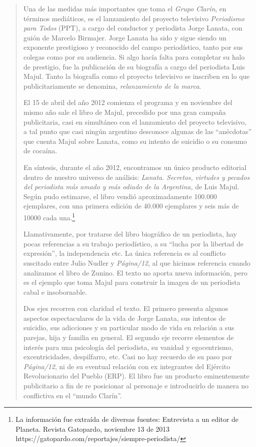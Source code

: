 \begin{quote}
Una de las medidas más importantes que toma el \emph{Grupo Clarín}, en términos mediáticos, es el lanzamiento del proyecto televisivo \emph{Periodismo para Todos} (PPT), a cargo del conductor y periodista Jorge Lanata, con guión de Marcelo Birmajer. Jorge Lanata ha sido y sigue siendo un exponente prestigioso y reconocido del campo periodístico, tanto por sus colegas como por su audiencia. Si algo hacía falta para completar su halo de prestigio, fue la publicación de su biografía a cargo del periodista Luis Majul. Tanto la biografía como el proyecto televisivo se inscriben en lo que publicitariamente se denomina, \emph{relanzamiento de la marca}.

El 15 de abril del año 2012 comienza el programa y en noviembre del mismo año sale el libro de Majul, precedido por una gran campaña publicitaria, casi en simultáneo con el lanzamiento del proyecto televisivo, a tal punto que casi ningún argentino desconoce algunas de las ``anécdotas'' que cuenta Majul sobre Lanata, como su intento de suicidio o su consumo de cocaína.

En síntesis, durante el año 2012, encontramos un único producto editorial dentro de nuestro universo de análisis: \emph{Lanata. Secretos, virtudes y pecados del periodista más amado y más odiado de la Argentina,} de Luis Majul. Según pudo estimarse, el libro vendió aproximadamente 100.000 ejemplares, con una primera edición de 40.000 ejemplares y seis más de \num{10000} cada una.\footnote{La información fue extraída de diversas fuentes: Entrevista a un editor de Planeta.
	Revista Gatopardo, noviembre 13 de 2013 https://gatopardo.com/reportajes/siempre-periodista/}

Llamativamente, por tratarse del libro biográfico de un periodista, hay pocas referencias a su trabajo periodístico, a su ``lucha por la libertad de expresión'', la independencia etc. La única referencia es al conflicto suscitado entre Julio Nudler y \emph{Página/12}, al que hicimos referencia cuando analizamos el libro de Zunino. El texto no aporta nueva información, pero es el ejemplo que toma Majul para construir la imagen de un periodista cabal e insobornable.

Dos ejes recorren con claridad el texto. El primero presenta algunos aspectos espectaculares de la vida de Jorge Lanata, sus intentos de suicidio, sus adicciones y su particular modo de vida en relación a sus parejas, hija y familia en general. El segundo eje recorre elementos de interés para una psicología del periodista, su vanidad y egocentrismo, excentricidades, despilfarro, etc. Casi no hay recuerdo de su paso por \emph{Página/12}, ni de su eventual relación con ex integrantes del Ejército Revolucionario del Pueblo (ERP). El libro fue un producto eminentemente publicitario a fin de re posicionar al personaje e introducirlo de manera no conflictiva en el ``mundo Clarín''.


\end{quote}
